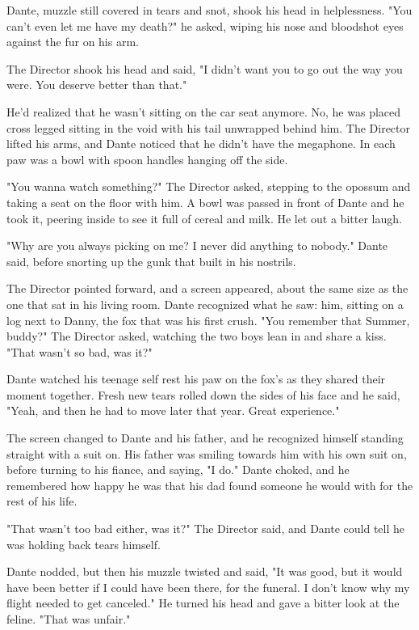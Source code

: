 Dante, muzzle still covered in tears and snot, shook his head in helplessness. "You can't even let me have my death?" he asked, wiping his nose and bloodshot eyes against the fur on his arm.

The Director shook his head and said, "I didn't want you to go out the way you were. You deserve better than that."

He'd realized that he wasn't sitting on the car seat anymore. No, he was placed cross legged sitting in the void with his tail unwrapped behind him. The Director lifted his arms, and Dante noticed that he didn't have the megaphone. In each paw was a bowl with spoon handles hanging off the side.

"You wanna watch something?" The Director asked, stepping to the opossum and taking a seat on the floor with him. A bowl was passed in front of Dante and he took it, peering inside to see it full of cereal and milk. He let out a bitter laugh.

"Why are you always picking on me? I never did anything to nobody." Dante said, before snorting up the gunk that built in his nostrils.

The Director pointed forward, and a screen appeared, about the same size as the one that sat in his living room. Dante recognized what he saw: him, sitting on a log next to Danny, the fox that was his first crush. "You remember that Summer, buddy?" The Director asked, watching the two boys lean in and share a kiss. "That wasn't so bad, was it?"

Dante watched his teenage self rest his paw on the fox's as they shared their moment together. Fresh new tears rolled down the sides of his face and he said, "Yeah, and then he had to move later that year. Great experience."

The screen changed to Dante and his father, and he recognized himself standing straight with a suit on. His father was smiling towards him with his own suit on, before turning to his fiance, and saying, "I do." Dante choked, and he remembered how happy he was that his dad found someone he would with for the rest of his life.

"That wasn't too bad either, was it?" The Director said, and Dante could tell he was holding back tears himself.

Dante nodded, but then his muzzle twisted and said, "It was good, but it would have been better if I could have been there, for the funeral. I don't know why my flight needed to get canceled." He turned his head and gave a bitter look at the feline. "That was unfair."

